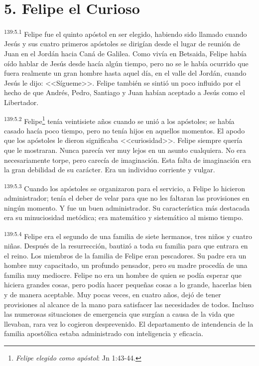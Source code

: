 \section*{5. Felipe el Curioso}
\par 
\textsuperscript{139:5.1} Felipe fue el quinto apóstol en ser elegido, habiendo sido llamado cuando Jesús y sus cuatro primeros apóstoles se dirigían desde el lugar de reunión de Juan en el Jordán hacia Caná de Galilea. Como vivía en Betsaida, Felipe había oído hablar de Jesús desde hacía algún tiempo, pero no se le había ocurrido que fuera realmente un gran hombre hasta aquel día, en el valle del Jordán, cuando Jesús le dijo: <<Sígueme>>. Felipe también se sintió un poco influido por el hecho de que Andrés, Pedro, Santiago y Juan habían aceptado a Jesús como el Libertador.

\par 
\textsuperscript{139:5.2} Felipe\footnote{\textit{Felipe elegido como apóstol}: Jn 1:43-44.} tenía veintisiete años cuando se unió a los apóstoles; se había casado hacía poco tiempo, pero no tenía hijos en aquellos momentos. El apodo que los apóstoles le dieron significaba <<curiosidad>>. Felipe siempre quería que le mostraran. Nunca parecía ver muy lejos en un asunto cualquiera. No era necesariamente torpe, pero carecía de imaginación. Esta falta de imaginación era la gran debilidad de su carácter. Era un individuo corriente y vulgar.

\par 
\textsuperscript{139:5.3} Cuando los apóstoles se organizaron para el servicio, a Felipe lo hicieron administrador; tenía el deber de velar para que no les faltaran las provisiones en ningún momento. Y fue un buen administrador. Su característica más destacada era su minuciosidad metódica; era matemático y sistemático al mismo tiempo.

\par 
\textsuperscript{139:5.4} Felipe era el segundo de una familia de siete hermanos, tres niños y cuatro niñas. Después de la resurrección, bautizó a toda su familia para que entrara en el reino. Los miembros de la familia de Felipe eran pescadores. Su padre era un hombre muy capacitado, un profundo pensador, pero su madre procedía de una familia muy mediocre. Felipe no era un hombre de quien se podía esperar que hiciera grandes cosas, pero podía hacer pequeñas cosas a lo grande, hacerlas bien y de manera aceptable. Muy pocas veces, en cuatro años, dejó de tener provisiones al alcance de la mano para satisfacer las necesidades de todos. Incluso las numerosas situaciones de emergencia que surgían a causa de la vida que llevaban, rara vez lo cogieron desprevenido. El departamento de intendencia de la familia apostólica estaba administrado con inteligencia y eficacia.

